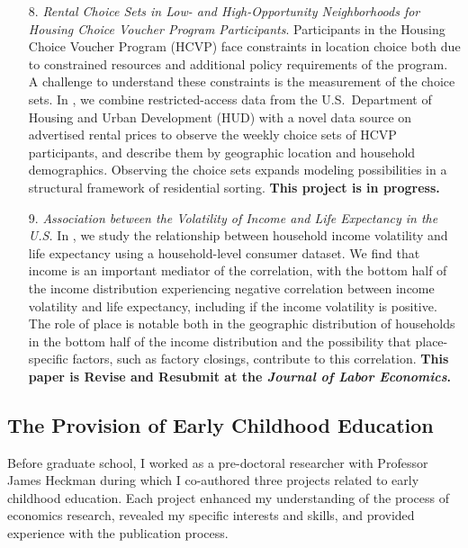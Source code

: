 \begin{enumerate}

\item[8.] \textit{Rental Choice Sets in Low- and High-Opportunity Neighborhoods for Housing Choice Voucher Program Participants}. Participants in the Housing Choice Voucher Program (HCVP) face constraints in location choice both due to constrained resources and additional policy requirements of the program. A challenge to understand these constraints is the measurement of the choice sets. In \citet{park_rental_2023}, we combine restricted-access data from the U.S.\ Department of Housing and Urban Development (HUD) with a novel data source on advertised rental prices to observe the weekly choice sets of HCVP participants, and describe them by geographic location and household demographics. Observing the choice sets expands modeling possibilities in a structural framework of residential sorting. \textbf{This project is in progress.}


\item[9.] \textit{Association between the Volatility of Income and Life Expectancy in the U.S.} In \citet{ziff_association_2023}, we study the relationship between household income volatility and life expectancy using a household-level consumer dataset. We find that income is an important mediator of the correlation, with the bottom half of the income distribution experiencing negative correlation between income volatility and life expectancy, including if the income volatility is positive. The role of place is notable both in the geographic distribution of households in the bottom half of the income distribution and the possibility that place-specific factors, such as factory closings, contribute to this correlation. \textbf{This paper is Revise and Resubmit at the \textit{Journal of Labor Economics}.}


\end{enumerate}

\subsection{The Provision of Early Childhood Education}

Before graduate school, I worked as a pre-doctoral researcher with Professor James Heckman during which I co-authored three projects related to early childhood education. Each project enhanced my understanding of the process of economics research, revealed my specific interests and skills, and provided experience with the publication process. 

